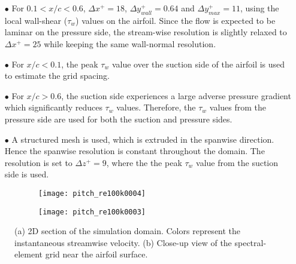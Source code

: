 \begin{itemize}
	\item[$\bullet$] For $0.1<x/c<0.6$, $\Delta x^{+}=18$, $\Delta y_{wall}^{+}=0.64$ and $\Delta y_{max}^{+}=11$, using the local wall-shear ($\tau_{w}$) values on the airfoil. Since the flow is expected to be laminar on the pressure side, the stream-wise resolution is slightly relaxed to $\Delta x^{+}=25$ while keeping the same wall-normal resolution.
	\item[$\bullet$] For $x/c<0.1$, the peak $\tau_{w}$ value over the suction side of the airfoil is used to estimate the grid spacing.
	\item [$\bullet$] For $x/c>0.6$, the suction side experiences a large adverse pressure gradient which significantly reduces $\tau_{w}$ values. Therefore, the $\tau_{w}$ values from the pressure side are used for both the suction and pressure sides.
	\item [$\bullet$] A structured mesh is used, which is extruded in the spanwise direction. Hence the spanwise resolution is constant throughout the domain. The resolution is set to $\Delta z^{+}=9$, where the the peak $\tau_{w}$ value from the suction side is used.
\end{itemize}

\begin{figure}[h]
	\begin{subfigure}[t]{0.49\textwidth}
		\centering
		\caption{}		
		\texttt{[image: pitch\_re100k0004]}
		\label{fig:re100k_domain}
	\end{subfigure}	
	\begin{subfigure}[t]{0.49\textwidth}
		\centering
		\caption{}		
		\texttt{[image: pitch\_re100k0003]}
		\label{fig:re100k_grid}
	\end{subfigure}
	\caption{(a) 2D section of the simulation domain. Colors represent the instantaneous streamwise velocity. (b) Close-up view of the spectral-element grid near the airfoil surface.}	
\end{figure}


